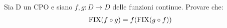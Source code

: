 
{Sia D un CPO e siano $f,g: D \to{} D$ delle funzioni continue. Provare che:
\begin{align*}
\textrm{\normalfont{FIX}}(f \circ g) = f(\textrm{\normalfont{FIX}}(g \circ f))
\end{align*}
}
{}

